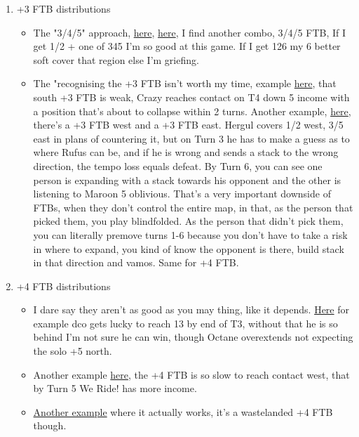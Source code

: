 \begin{enumerate}
\begin{itemize}
    \end{itemize}
    \item +3 FTB distributions
    \begin{itemize}
        \item The "3/4/5" approach, \href{https://www.warzone.com/MultiPlayer?GameID=38505036}{here}, \href{https://www.warzone.com/MultiPlayer?GameID=38486921}{here}, I find another combo, 3/4/5 FTB, If I get 1/2 + one of 345 I'm so good at this game. If I get 126 my 6 better soft cover that region else I'm griefing. 
        \item The "recognising the +3 FTB isn't worth my time, example \href{https://www.warzone.com/MultiPlayer?GameID=34604299}{here}, that south +3 FTB is weak, Crazy reaches contact on T4 down 5 income with a position that's about to collapse within 2 turns. Another example, \href{https://www.warzone.com/MultiPlayer?GameID=32067072}{here}, there's a +3 FTB west and a +3 FTB east. Hergul covers 1/2 west, 3/5 east in plans of countering it, but on Turn 3 he has to make a guess as to where Rufus can be, and if he is wrong and sends a stack to the wrong direction, the tempo loss equals defeat. By Turn 6, you can see one person is expanding with a stack towards his opponent and the other is listening to Maroon 5 oblivious. That's a very important downside of FTBs, when they don't control the entire map, in that, as the person that picked them, you play blindfolded. As the person that didn't pick them, you can literally premove turns 1-6 because you don't have to take a risk in where to expand, you kind of know the opponent is there, build stack in that direction and vamos. Same for +4 FTB.
    \end{itemize}
    \item +4 FTB distributions
    \begin{itemize}
        \item I dare say they aren't as good as you may thing, like it depends. \href{https://www.warzone.com/MultiPlayer?GameID=37300392}{Here} for example dco gets lucky to reach 13 by end of T3, without that he is so behind I'm not sure he can win, though Octane overextends not expecting the solo +5 north.
        \item Another example \href{https://www.warzone.com/MultiPlayer?GameID=32348809}{here}, the +4 FTB is so slow to reach contact west, that by Turn 5 We Ride! has more income. 
        \item \href{https://www.warzone.com/MultiPlayer?GameID=26914947}{Another example} where it actually works, it's a wastelanded +4 FTB though.

\end{itemize}
\end{enumerate}
